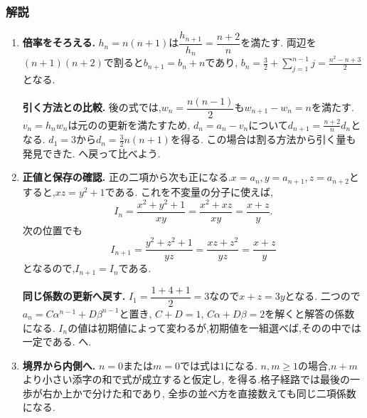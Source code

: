   \subsubsection{解説}
  \begin{enumerate}[label=\textbf{問\arabic*.},format=\bookitemlink{practice-connections}{solution}{problem}]
    \item \textbf{倍率をそろえる.}
      $h_n=n(n+1)$は$\dfrac{h_{n+1}}{h_n}=\dfrac{n+2}{n}$を満たす.
      両辺を$(n+1)(n+2)$で割ると$b_{n+1}=b_n+n$であり,
      $b_n=\frac32+\sum_{j=1}^{n-1}j=\frac{n^2-n+3}{2}$となる.
      \par\smallskip\textbf{引く方法との比較.}
      後の式では,$w_n=\dfrac{n(n-1)}{2}$も$w_{n+1}-w_n=n$を満たす.
      $v_n=h_nw_n$は元のの更新を満たすため,
      $d_n=a_n-v_n$について$d_{n+1}=\frac{n+2}{n}d_n$となる.
      $d_1=3$から$d_n=\frac32n(n+1)$を得る.
      この場合は割る方法から引く量も発見できた.
      へ戻って比べよう.
    \item \textbf{正値と保存の確認.}
      正の二項から次も正になる.$x=a_n,y=a_{n+1},z=a_{n+2}$とすると,$xz=y^2+1$である.
      これを不変量の分子に使えば,
      \[
        I_n=\frac{x^2+y^2+1}{xy}
           =\frac{x^2+xz}{xy}=\frac{x+z}{y}.
      \]
      次の位置でも
      \[
        I_{n+1}=\frac{y^2+z^2+1}{yz}
               =\frac{xz+z^2}{yz}=\frac{x+z}{y}
      \]
      となるので,$I_{n+1}=I_n$である.
      \par\smallskip\textbf{同じ係数の更新へ戻す.}
      $I_1=\dfrac{1+4+1}{2}=3$なので$x+z=3y$となる.
      二つので$a_n=C\alpha^{n-1}+D\beta^{n-1}$と置き,
      $C+D=1$, $C\alpha+D\beta=2$を解くと解答の係数になる.
      $I_n$の値は初期値によって変わるが,初期値を一組選べば,そのの中では一定である.
      へ.
    \item \textbf{境界から内側へ.}
      $n=0$または$m=0$では式は$1$になる.
      $n,m\ge1$の場合,$n+m$より小さい添字の和で式が成立すると仮定し,
      \BookMathLayout{\[
        A_{n,m}=\binom{n+m-1}{m}+\binom{n+m-1}{m-1}
               =\binom{n+m}{m}
      \]}{\[
    \begin{aligned}
      A_{n,m}&=\binom{n+m-1}{m}+\binom{n+m-1}{m-1}\\
      &=\binom{n+m}{m}
    \end{aligned}
  \]}
      を得る.格子経路では最後の一歩が右か上かで分けた和であり,
      全歩の並べ方を直接数えても同じ二項係数になる.

\end{enumerate}
